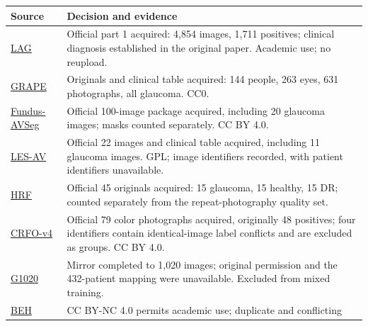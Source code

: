 \documentclass[
  10pt,
]{article}
\begin{document}
\begin{longtable}[]{@{}
  >{\raggedright\arraybackslash}p{}
  >{\raggedright\arraybackslash}p{}@{}}
\toprule\noalign{}
\begin{minipage}[b]{\linewidth}\raggedright
Source
\end{minipage} & \begin{minipage}[b]{\linewidth}\raggedright
Decision and evidence
\end{minipage} \\
\midrule\noalign{}
\endhead
\bottomrule\noalign{}
\endlastfoot
\href{https://github.com/smilell/AG-CNN}{LAG} & Official part 1
acquired: 4,854 images, 1,711 positives; clinical diagnosis established
in the original paper. Academic use; no reupload. \\
\href{https://springernature.figshare.com/articles/dataset/GRAPE_dataset_CFPs/23575926}{GRAPE}
& Originals and clinical table acquired: 144 people, 263 eyes, 631
photographs, all glaucoma. CC0. \\
\href{https://figshare.com/articles/dataset/27938034}{Fundus-AVSeg} &
Official 100-image package acquired, including 20 glaucoma images; masks
counted separately. CC BY 4.0. \\
\href{https://figshare.com/articles/dataset/LES-AV_dataset/11857698}{LES-AV}
& Official 22 images and clinical table acquired, including 11 glaucoma
images. GPL; image identifiers recorded, with patient identifiers
unavailable. \\
\href{https://www5.informatik.uni-erlangen.de/research/data/fundus-images/}{HRF}
& Official 45 originals acquired: 15 glaucoma, 15 healthy, 15 DR;
counted separately from the repeat-photography quality set. \\
\href{https://data.mendeley.com/datasets/trghs22fpg/4}{CRFO-v4} &
Official 79 color photographs acquired, originally 48 positives; four
identifiers contain identical-image label conflicts and are excluded as
groups. CC BY 4.0. \\
\href{https://arxiv.org/abs/2006.09158}{G1020} & Mirror completed to
1,020 images; original permission and the 432-patient mapping were
unavailable. Excluded from mixed training. \\
\href{https://github.com/mirtanvirislam/Deep-Learning-Based-Glaucoma-Detection-with-Cropped-Optic-Cup-and-Disc-and-Blood-Vessel-Segmentation/tree/master/Dataset}{BEH}
& CC BY-NC 4.0 permits academic use; duplicate and conflicting

\end{longtable}
\end{document}
